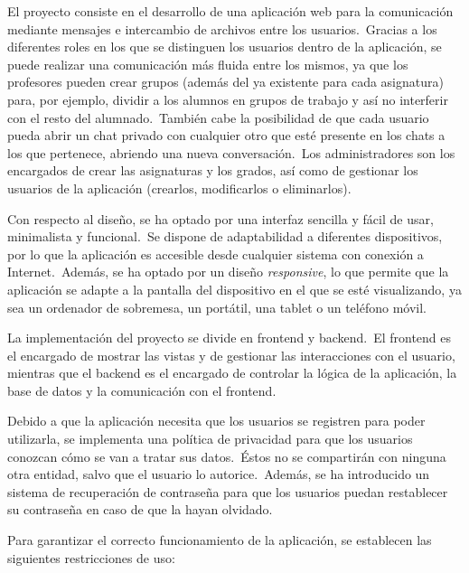 

El proyecto consiste en el desarrollo de una aplicación web para la comunicación mediante mensajes e intercambio de
archivos entre los usuarios.\ Gracias a los diferentes roles en los que se distinguen los usuarios dentro de la
aplicación, se puede
realizar una comunicación más fluida entre los mismos, ya que los profesores pueden crear grupos (además del ya
existente para cada asignatura) para, por ejemplo, dividir a los alumnos en grupos de trabajo y así no interferir con
el resto del alumnado.\ También cabe la posibilidad de que cada usuario pueda abrir un chat privado con cualquier
otro que esté presente en los chats a los que pertenece, abriendo una nueva conversación.\ Los administradores son
los encargados de crear las asignaturas y los grados, así como de gestionar los usuarios de la aplicación (crearlos,
modificarlos o eliminarlos).

Con respecto al diseño, se ha optado por una interfaz sencilla y fácil de usar, minimalista y funcional.\ Se dispone
de adaptabilidad a diferentes dispositivos, por lo que la aplicación es accesible desde cualquier sistema con
conexión a Internet.\ Además, se ha optado por un diseño \textit{responsive}, lo que permite que la aplicación se
adapte a la
pantalla del dispositivo en el que se esté visualizando, ya sea un ordenador de sobremesa, un portátil, una tablet o un
teléfono móvil.

La implementación del proyecto se divide en frontend y backend.\ El frontend es el encargado de mostrar las vistas
y de gestionar las interacciones con el usuario, mientras que el backend es el encargado de controlar la lógica de
la aplicación, la base de datos y la comunicación con el frontend.

Debido a que la aplicación necesita que los usuarios se registren para poder utilizarla, se implementa una política de
privacidad para que los usuarios conozcan cómo se van a tratar sus datos.\ Éstos no se compartirán con
ninguna otra entidad, salvo que el usuario lo autorice.\ Además, se ha introducido un sistema de
recuperación de contraseña para que los usuarios puedan restablecer su contraseña en caso de que la hayan olvidado.


Para garantizar el correcto funcionamiento de la aplicación, se establecen las siguientes restricciones de uso:

